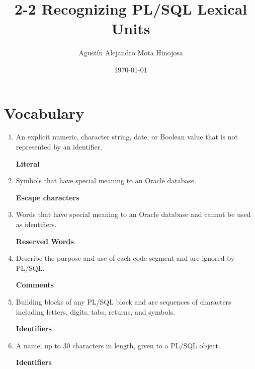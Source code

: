 \documentclass[11pt]{article}
\author{Agustín Alejandro Mota Hinojosa}
\date{\today}
\title{2-2 Recognizing PL/SQL Lexical Units}
\begin{document}
\maketitle
\tableofcontents

\section{Vocabulary}
\label{sec:org3bedc90}
\begin{enumerate}
\item An explicit numeric, character string, date, or Boolean value that is not
represented by an identifier.

\textbf{Literal}

\item Symbols that have special meaning to an Oracle database.

\textbf{Escape characters}

\item Words that have special meaning to an Oracle database and cannot be used
as identifiers.

\textbf{Reserved Words}

\item Describe the purpose and use of each code segment and are ignored by
PL/SQL.

\textbf{Comments}

\item Building blocks of any PL/SQL block and are sequences of characters
including letters, digits, tabs, returns, and symbols.

\textbf{Identifiers}

\item A name, up to 30 characters in length, given to a PL/SQL object.

\textbf{Identifiers}
\end{enumerate}
\end{document}
